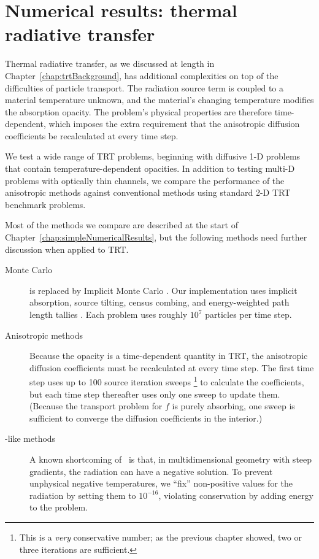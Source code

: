 
\chapter{Numerical results: thermal radiative transfer}
\label{chap:trtNumericalResults}

Thermal radiative transfer, as we discussed at length in
Chapter~\ref{chap:trtBackground}, has additional complexities on top of the
difficulties of particle transport. The radiation source term is coupled to a
material temperature unknown, and the material's changing temperature modifies
the absorption opacity. 
The problem's physical properties are therefore time-dependent, which
imposes the extra requirement that the anisotropic diffusion coefficients be
recalculated at every time step.

We test a wide range of TRT problems, beginning with diffusive 1-D problems that
contain temperature-dependent opacities. In addition to testing multi-D problems
with optically thin channels, we compare the performance of the anisotropic
methods against conventional methods using standard 2-D TRT benchmark problems.

Most of the methods we compare are described at the start of
Chapter~\ref{chap:simpleNumericalResults}, but the following methods need
further discussion when applied to TRT.
\begin{description}

  \item[Monte Carlo] is replaced by Implicit Monte Carlo \cite{Fle1971}. Our
    implementation uses implicit absorption, source tilting, census combing, and
    energy-weighted path length tallies \cite{Urb2006}. Each problem uses
    roughly $10^7$ particles per time step.

  \item[Anisotropic methods] Because the opacity is a time-dependent quantity
in TRT, the anisotropic diffusion coefficients must be recalculated at every
time step. The first time step uses up to 100 source iteration sweeps%
\footnote{%
  This is a \emph{very} conservative number; as the previous chapter showed,
  two or three iterations are sufficient.
} to
calculate the coefficients, but each time step thereafter uses only one sweep to
update them. (Because the transport problem for $f$ is purely absorbing, one
sweep is sufficient to converge the diffusion coefficients in the interior.)

  \item[\Pone-like methods] A known shortcoming of \Pone\ is that, in
    multidimensional geometry with steep gradients, the radiation can have a
    negative solution. To prevent unphysical negative temperatures, we
    ``fix'' non-positive values for the radiation by setting them
    to $10^{-16}$, violating conservation by adding energy to the problem.

\end{description}

